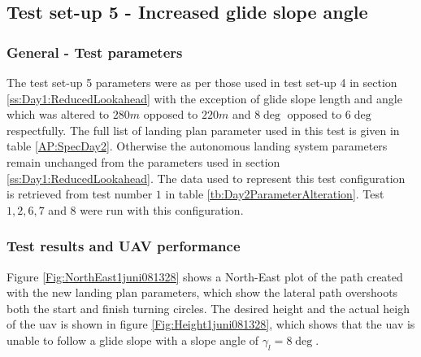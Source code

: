 \subsection{Test set-up 5 - Increased glide slope angle}\label{ss:Day2GlideSlope}
\subsubsection{General - Test parameters}
The test set-up 5 parameters were as per those used in test set-up 4 in section \ref{ss:Day1:ReducedLookahead} with the exception of glide slope length and angle which was altered to $280 m$ opposed to $220 m$ and $8 \deg$ opposed to $6 \deg$ respectfully. The full list of landing plan parameter used in this test is given in table \ref{AP:SpecDay2}. Otherwise the autonomous landing system parameters remain unchanged from the parameters used in section \ref{ss:Day1:ReducedLookahead}. The data used to represent this test configuration is retrieved from test number $1$ in table \ref{tb:Day2ParameterAlteration}. Test $1,2,6,7$ and $8$ were run with this configuration.
\subsubsection{Test results and UAV performance}
Figure \ref{Fig:NorthEast1juni081328} shows a North-East plot of the path created with the new landing plan parameters, which show the lateral path overshoots both the start and finish turning circles. The desired height and the actual heigh of the \gls{uav} is shown in figure \ref{Fig:Height1juni081328}, which shows that the \gls{uav} is unable to follow a glide slope with a slope angle of $\gamma_l = 8 \deg$. 

